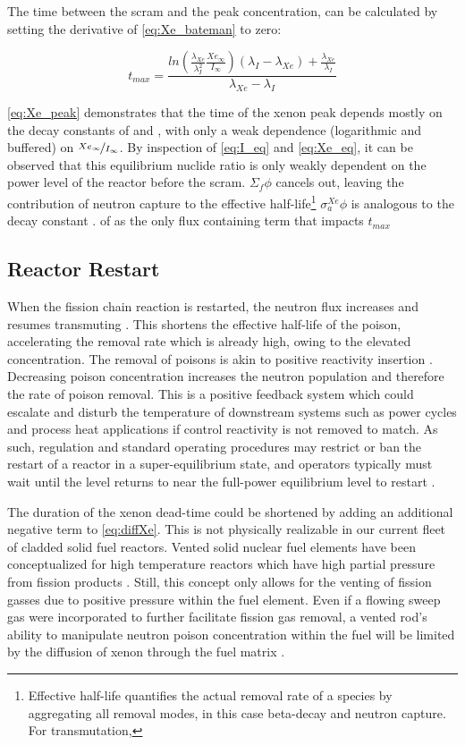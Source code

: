 The time between the scram and the peak \Xe concentration, can be calculated by setting the derivative of \ref{eq:Xe_bateman} to zero:

\begin{equation}\label{eq:Xe_peak}
    t_{max} = \frac{ln\left(\frac{\lambda_{Xe}}{\lambda_{I}^2}\frac{Xe_{\infty}}{I_{\infty}}\right)\left(\lambda_{I}-\lambda_{Xe}\right)+\frac{\lambda_{Xe}}{\lambda_{I}}}{\lambda_{Xe}-\lambda_{I}}
\end{equation}

\ref{eq:Xe_peak} demonstrates that the time of the xenon peak depends mostly on the decay constants of \Xe and \I, with only a weak dependence (logarithmic and buffered) on $\nicefrac{Xe_{\infty}}{I_\infty}$. By inspection of \ref{eq:I_eq} and \ref{eq:Xe_eq}, it can be observed that this equilibrium nuclide ratio is only weakly dependent on the power level of the reactor before the scram. $\Sigma_f\phi$ cancels out, leaving the contribution of neutron capture to the effective half-life\footnote{\label{fn:EHL} Effective half-life quantifies the actual removal rate of a species by aggregating all removal modes, in this case beta-decay and neutron capture. For transmutation,} $\sigma_a^{Xe}\phi$ is analogous to the decay constant \cite[Ch. 7]{Lamarsh}.
of \Xe as the only flux containing term that impacts $t_{max}$ 


\subsection{Reactor Restart}
When the fission chain reaction is restarted, the neutron flux increases and resumes transmuting \Xe. This shortens the effective half-life of the poison, accelerating the removal rate which is already high, owing to the elevated concentration. The removal of poisons is akin to positive reactivity insertion \cite{Roberson}. Decreasing poison concentration increases the neutron population and therefore the rate of poison removal. This is a positive feedback system which could escalate and disturb the temperature of downstream systems such as power cycles and process heat applications if control reactivity is not removed to match. As such, regulation and standard operating procedures may restrict or ban the restart of a reactor in a super-equilibrium state, and operators typically must wait until the \Xe level returns to near the full-power equilibrium level to restart \cite{CFR}.

The duration of the xenon dead-time could be shortened by adding an additional negative term to \ref{eq:diffXe}. This is not physically realizable in our current fleet of cladded solid fuel reactors. Vented solid nuclear fuel elements have been conceptualized for high temperature reactors which have high partial pressure from fission products \cite{VentPatent,VentedRods}. Still, this concept only allows for the venting of fission gasses due to positive pressure within the fuel element. Even if a flowing sweep gas were incorporated to further facilitate fission gas removal, a vented rod's ability to manipulate neutron poison concentration within the fuel will be limited by the diffusion of xenon through the fuel matrix \cite{XeDiffuse}.

